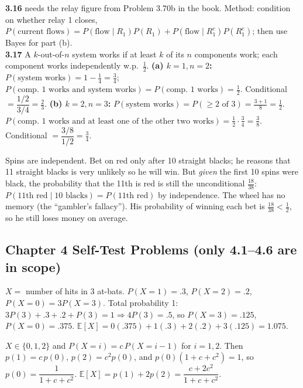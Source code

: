 \documentclass[11pt]{article}
\let\oldsubsection\subsection
\renewcommand{\subsection}{\Needspace{14\baselineskip}\oldsubsection}
\newcommand{\E}{\mathbb{E}}
\begin{document}
\begin{exbox}[3.16--3.17 Systems]
\textbf{3.16} needs the relay figure from Problem 3.70b in the book. Method: condition on whether relay 1 closes, $P(\text{current flows})=P(\text{flow}\mid R_1)P(R_1)+P(\text{flow}\mid R_1^c)P(R_1^c)$; then use Bayes for part (b).\\
\textbf{3.17} A $k$-out-of-$n$ system works if at least $k$ of its $n$ components work; each component works independently w.p.\ $\tfrac12$. \textbf{(a) $k=1,n=2$:} $P(\text{system works})=1-\tfrac14=\tfrac34$; $P(\text{comp.\ 1 works and system works})=P(\text{comp.\ 1 works})=\tfrac12$. Conditional $=\dfrac{1/2}{3/4}=\boxed{\tfrac23}$. \textbf{(b) $k=2,n=3$:} $P(\text{system works})=P(\ge2\text{ of }3)=\tfrac{3+1}8=\tfrac12$. $P(\text{comp.\ 1 works and at least one of the other two works})=\tfrac12\cdot\tfrac34=\tfrac38$. Conditional $=\dfrac{3/8}{1/2}=\boxed{\tfrac34}$.
\end{exbox}

\begin{exbox}
Spins are independent. Bet on red only after 10 straight blacks; he reasons that 11 straight blacks is very unlikely so he will win. But \emph{given} the first 10 spins were black, the probability that the 11th is red is still the unconditional $\tfrac{18}{38}$: $P(\text{11th red}\mid\text{10 blacks})=P(\text{11th red})$ by independence. The wheel has no memory (the ``gambler's fallacy''). His probability of winning each bet is $\tfrac{18}{38}<\tfrac12$, so he still loses money on average.
\end{exbox}

\subsection{Chapter 4 Self-Test Problems (only 4.1--4.6 are in scope)}

\begin{exbox}
$X=$ number of hits in 3 at-bats. $P(X=1)=.3$, $P(X=2)=.2$, $P(X=0)=3P(X=3)$. Total probability 1: $3P(3)+.3+.2+P(3)=1\Rightarrow4P(3)=.5$, so $P(X=3)=.125$, $P(X=0)=.375$. $\E[X]=0(.375)+1(.3)+2(.2)+3(.125)=\boxed{1.075}$.
\end{exbox}

\begin{exbox}
$X\in\{0,1,2\}$ and $P(X=i)=c\,P(X=i-1)$ for $i=1,2$. Then $p(1)=c\,p(0)$, $p(2)=c^2p(0)$, and $p(0)(1+c+c^2)=1$, so $p(0)=\dfrac1{1+c+c^2}$. $\E[X]=p(1)+2p(2)=\boxed{\dfrac{c+2c^2}{1+c+c^2}}$.
\end{exbox}
\end{document}
